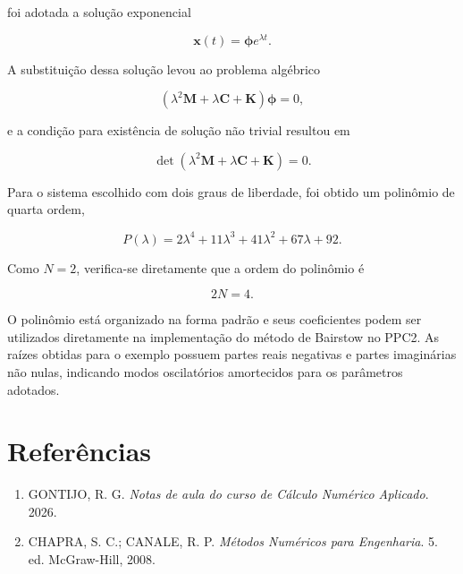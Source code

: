 \documentclass[12pt,a4paper]{article}
\begin{document}
foi adotada a solução exponencial

\begin{equation}
\mathbf{x}(t)=\boldsymbol{\phi}e^{\lambda t}.
\end{equation}

A substituição dessa solução levou ao problema algébrico

\begin{equation}
\left(
\lambda^2\mathbf{M}
+\lambda\mathbf{C}
+\mathbf{K}
\right)\boldsymbol{\phi}=0,
\end{equation}

e a condição para existência de solução não trivial resultou em

\begin{equation}
\det
\left(
\lambda^2\mathbf{M}
+\lambda\mathbf{C}
+\mathbf{K}
\right)=0.
\end{equation}

Para o sistema escolhido com dois graus de liberdade, foi obtido um polinômio
de quarta ordem,

\begin{equation}
\boxed{
P(\lambda)
=
2\lambda^4
+11\lambda^3
+41\lambda^2
+67\lambda
+92
}.
\end{equation}

Como $N=2$, verifica-se diretamente que a ordem do polinômio é

\begin{equation}
2N=4.
\end{equation}

O polinômio está organizado na forma padrão e seus coeficientes podem ser
utilizados diretamente na implementação do método de Bairstow no PPC2. As
raízes obtidas para o exemplo possuem partes reais negativas e partes
imaginárias não nulas, indicando modos oscilatórios amortecidos para os
parâmetros adotados.

\section*{Referências}

\begin{enumerate}
    \item GONTIJO, R. G. \textit{Notas de aula do curso de Cálculo Numérico
    Aplicado}. 2026.
    \item CHAPRA, S. C.; CANALE, R. P. \textit{Métodos Numéricos para
    Engenharia}. 5. ed. McGraw-Hill, 2008.
\end{enumerate}
\end{document}
